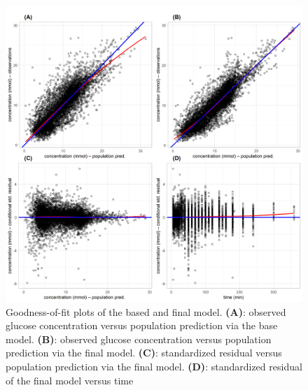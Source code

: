\documentclass[utf8]{frontiersSCNS} %
\begin{document}
\begin{figure}[h!]
\begin{center}
\includegraphics[width=14cm]{comb.PNG}
\end{center}
\caption{Goodness-of-fit plots of the based and final model. \textbf{(A)}: observed glucose concentration versus population prediction via the base model.  \textbf{(B)}: observed glucose concentration versus population prediction via the final model. \textbf{(C)}: standardized residual versus population prediction via the final model. \textbf{(D)}: standardized residual of the final model versus time}
\label{fig: fittings}
\end{figure}
\end{document}
